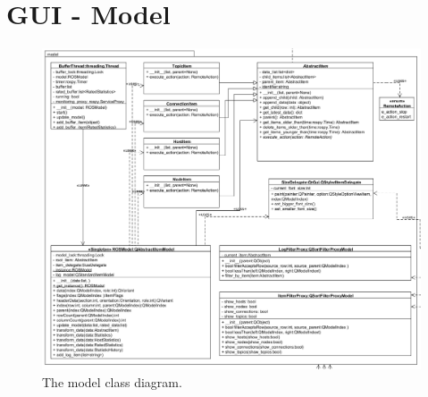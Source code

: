 \section{GUI - Model}
\begin{figure}[!ht]
\begin{center}
\includegraphics[width=1.0\linewidth]{./diagram_pictures/model.png}
\caption{The model class diagram.}
\end{center}
\end{figure}

\newpage
